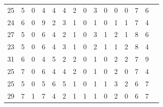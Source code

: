 \begin{table}[]
\begin{tabular}{rrrrrrrrrrrrrrr}
		25 & 5 & 0 & 4 & 4 & 4 & 2 & 0 & 3 & 0 & 0 & 0 & 7 & 6 \\
		24 & 6 & 0 & 9 & 2 & 3 & 1 & 0 & 1 & 0 & 1 & 1 & 7 & 4 \\
		27 & 5 & 0 & 6 & 4 & 2 & 1 & 0 & 3 & 1 & 2 & 1 & 8 & 6 \\
		23 & 5 & 0 & 6 & 4 & 3 & 1 & 0 & 2 & 1 & 1 & 2 & 8 & 4 \\
		31 & 6 & 0 & 4 & 5 & 2 & 2 & 0 & 1 & 0 & 2 & 2 & 7 & 9 \\
		25 & 7 & 0 & 6 & 4 & 4 & 2 & 0 & 1 & 0 & 2 & 0 & 7 & 4 \\
		25 & 5 & 0 & 5 & 6 & 5 & 1 & 0 & 1 & 1 & 3 & 2 & 6 & 7 \\
		29 & 7 & 1 & 7 & 4 & 2 & 1 & 1 & 1 & 0 & 2 & 0 & 6 & 7
	\end{tabular}
\end{table}

